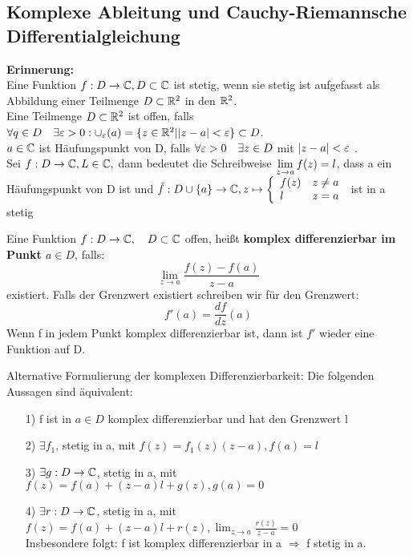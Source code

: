 \subsection{Komplexe Ableitung und Cauchy-Riemannsche Differentialgleichung}
\textbf{Erinnerung:}\\
Eine Funktion $f:D \to \mathbb{C}, D \subset \mathbb{C}$ ist stetig, wenn sie stetig ist aufgefasst als Abbildung einer Teilmenge $D\subset \mathbb{R}^2$ in den $\mathbb{R}^2$.\\
Eine Teilmenge $D\subset \mathbb{R}^2$ ist offen, falls $\forall q \in D \quad \exists \varepsilon > 0: \cup _\varepsilon(a) = \{z \in \mathbb{R}^2| |z-a| < \varepsilon\} \subset D$.\\
$a \in \mathbb{C}$ ist Häufungspunkt von D, falls $ \forall \varepsilon > 0 \quad \exists z \in D$ mit $|z-a| < \varepsilon$ .\\
Sei $f: D \to \mathbb{C}, L \in \mathbb{C},$ dann bedeutet die Schreibweise $\begin{displaystyle}
\lim_{z \to a} f(z)=l 
\end{displaystyle}$, dass a ein Häufungspunkt von D ist und $\tilde{f} : D \cup \{a\} \to \mathbb{C}, z\mapsto \left\{
\begin{array}{ll}
	f(z)&z\neq a\\
	l & z=a 
\end{array}\right. $ ist in a stetig


\begin{definition}
Eine Funktion $f: D \to \mathbb{C}, \quad D \subset \mathbb{C}$ offen, heißt \textbf{komplex differenzierbar im Punkt $a\in D$}, falls:
\[
\lim_{z \to a} \frac{f(z) -f(a)}{z-a}
\]
existiert. Falls der Grenzwert existiert schreiben wir für den Grenzwert:
\[
f\prime(a) = \frac{df}{dz}(a)
\]
Wenn f in jedem Punkt komplex differenzierbar ist, dann ist $f\prime$ wieder eine Funktion auf D.
\end{definition}

\begin{bemerkung}
Alternative Formulierung der komplexen Differenzierbarkeit:
Die folgenden Aussagen sind äquivalent:
\begin{itemize}
	\item[1)] 
	f ist in $a\in D$ komplex differenzierbar und hat den Grenzwert l
	\item[2)]
	$\exists f_1$, stetig in a, mit $f(z) = f_1(z)(z-a), f(a) = l$
	\item[3)]
	$\exists g: D \to \mathbb{C}$, stetig in a, mit $f(z) = f(a) + (z-a)l+ g(z), g(a)=0$
	\item[4)]
	$\exists r: D\to \mathbb{C}$, stetig in a, mit $f(z) = f(a) +(z-a)l + r(z), \lim_{z \to a}\frac{r(z)}{z-a}= 0$\\
	Insbesondere folgt: f ist komplex differenzierbar in a $\Rightarrow$ f stetig in a.
\end{itemize}
\end{bemerkung}

